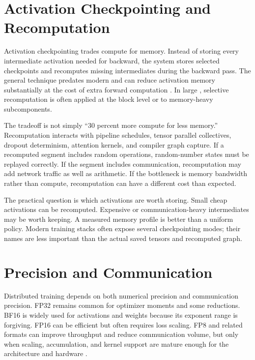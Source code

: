 \section{Activation Checkpointing and Recomputation}
\label{sec:activation-checkpointing}

Activation checkpointing trades compute for memory. Instead of storing every intermediate activation needed for backward, the system stores selected checkpoints and recomputes missing intermediates during the backward pass. The general technique predates modern \llms and can reduce activation memory substantially at the cost of extra forward computation \cite{chen2016training}. In large \transformers, selective recomputation is often applied at the block level or to memory-heavy subcomponents.

The tradeoff is not simply ``30 percent more compute for less memory.'' Recomputation interacts with pipeline schedules, tensor parallel collectives, dropout determinism, attention kernels, and compiler graph capture. If a recomputed segment includes random operations, random-number states must be replayed correctly. If the segment includes communication, recomputation may add network traffic as well as arithmetic. If the bottleneck is memory bandwidth rather than compute, recomputation can have a different cost than expected.

The practical question is which activations are worth storing. Small cheap activations can be recomputed. Expensive or communication-heavy intermediates may be worth keeping. A measured memory profile is better than a uniform policy. Modern training stacks often expose several checkpointing modes; their names are less important than the actual saved tensors and recomputed graph.

\section{Precision and Communication}
\label{sec:precision-communication}

Distributed training depends on both numerical precision and communication precision. FP32 remains common for optimizer moments and some reductions. BF16 is widely used for activations and weights because its exponent range is forgiving. FP16 can be efficient but often requires loss scaling. FP8 and related formats can improve throughput and reduce communication volume, but only when scaling, accumulation, and kernel support are mature enough for the architecture and hardware \cite{micikevicius2017mixed,deepseek2024v3}.

